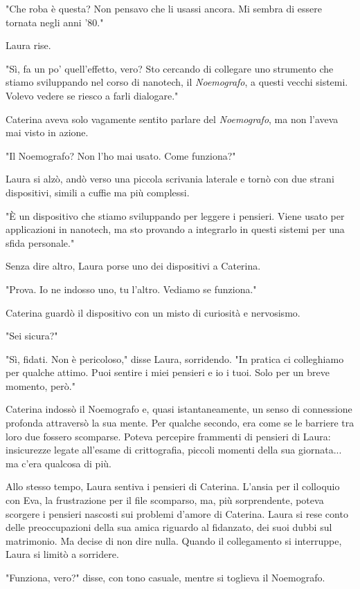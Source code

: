 "Che roba è questa? Non pensavo che li usassi ancora. Mi sembra di essere tornata negli anni '80."

Laura rise.

"Sì, fa un po' quell'effetto, vero? Sto cercando di collegare uno strumento che stiamo sviluppando nel corso di nanotech, il \emph{Noemografo}, a questi vecchi sistemi. Volevo vedere se riesco a farli dialogare."

Caterina aveva solo vagamente sentito parlare del \emph{Noemografo}, ma non l'aveva mai visto in azione.

"Il Noemografo? Non l'ho mai usato. Come funziona?"

Laura si alzò, andò verso una piccola scrivania laterale e tornò con due strani dispositivi, simili a cuffie ma più complessi.

"È un dispositivo che stiamo sviluppando per leggere i pensieri. Viene usato per applicazioni in nanotech, ma sto provando a integrarlo in questi sistemi per una sfida personale."

Senza dire altro, Laura porse uno dei dispositivi a Caterina.

"Prova. Io ne indosso uno, tu l'altro. Vediamo se funziona."

Caterina guardò il dispositivo con un misto di curiosità e nervosismo.

"Sei sicura?"

"Sì, fidati. Non è pericoloso," disse Laura, sorridendo. "In pratica ci colleghiamo per qualche attimo. Puoi sentire i miei pensieri e io i tuoi. Solo per un breve momento, però."

Caterina indossò il Noemografo e, quasi istantaneamente, un senso di connessione profonda attraversò la sua mente. Per qualche secondo, era come se le barriere tra loro due fossero scomparse. Poteva percepire frammenti di pensieri di Laura: insicurezze legate all'esame di crittografia, piccoli momenti della sua giornata... ma c'era qualcosa di più.

Allo stesso tempo, Laura sentiva i pensieri di Caterina. L'ansia per il colloquio con Eva, la frustrazione per il file scomparso, ma, più sorprendente, poteva scorgere i pensieri nascosti sui problemi d'amore di Caterina. Laura si rese conto delle preoccupazioni della sua amica riguardo al fidanzato, dei suoi dubbi sul matrimonio. Ma decise di non dire nulla. Quando il collegamento si interruppe, Laura si limitò a sorridere.

"Funziona, vero?" disse, con tono casuale, mentre si toglieva il Noemografo.

